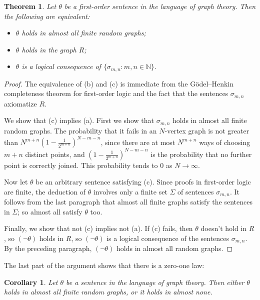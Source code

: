 \documentclass{book}
\newtheorem{theorem}{Theorem}
\newtheorem{corollary}{Corollary}
\begin{document}
\begin{theorem}\label{ch32:them6.1} 
Let $\theta$ be a first-order sentence in the
language of graph theory. Then the following are equivalent:
\begin{itemize}
\item[(a)] $\theta$ holds in almost all finite random graphs;
\item[(b)] $\theta$ holds in the graph $R$;
\item[(c)] $\theta$ is a logical consequence of $\{\sigma_{m,n} : m, n \in \mathbb{N}\}$.
\end{itemize}
\end{theorem}
\begin{proof}
The equivalence of (b) and (c) is immediate from the
G\"{o}del--Henkin completeness theorem for first-order logic and the
fact that the sentences $\sigma_{m,n}$ axiomatize $R$.

We show that (c) implies (a). First we show that $\sigma_{m,n}$
holds in almost all finite random graphs. The probability that it
fails in an $N$-vertex graph is not greater than $N^{m+n}(1 -
\frac{1}{2^{m+n}})^{N - m- n}$, since there are at most $N^{ m +n}$
ways of choosing $m + n$ distinct points, and $(1 -
\frac{1}{2^{m+n}})^{N - m- n}$ is the probability that no further
point is correctly joined. This probability tends to $0$ as $N
\rightarrow \infty$.

Now let $\theta$ be an arbitrary sentence satisfying (c). Since
proofs in first-order logic are finite, the deduction of $\theta$
involves only a finite set $\Sigma$ of sentences $\sigma_{m,n}$. It
follows from the last paragraph that almost all finite graphs
satisfy the sentences in $\Sigma$; so almost all satisfy $\theta$
too.

Finally, we show that not (c) implies not (a). If (c) fails, then
$\theta$ doesn't hold in $R$, so $(\neg \theta)$ holds in $R$, so
$(\neg \theta)$ is a logical consequence of the sentences
$\sigma_{m,n}$. By the preceding paragraph, $(\neg \theta)$ holds in
almost all random graphs.
\end{proof}

The last part of the argument shows that there is a zero-one law:

\begin{corollary}\label{ch32:coro6.1} 
Let $\theta$ be a sentence in the language of
graph theory. Then either $\theta$ holds in almost all finite random
graphs, or it holds in almost none.
\end{corollary}
\end{document}
